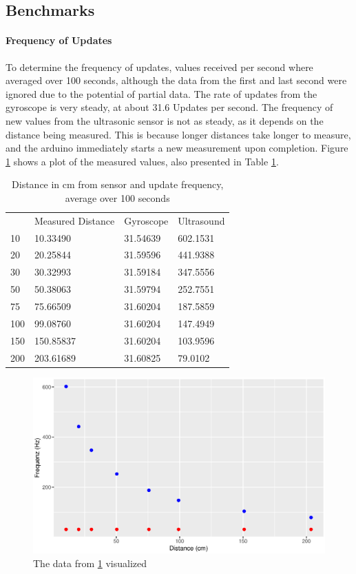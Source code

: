 \subsection{Benchmarks}
\label{subsec:benchmark}

\paragraph{Frequency of Updates}
To determine the frequency of updates, values received per second where averaged over 100 seconds, although the data from the first and last second were ignored due to the potential of partial data.
The rate of updates from the gyroscope is very steady, at about 31.6 Updates per second.
The frequency of new values from the ultrasonic sensor is not as steady, as it depends on the distance being measured.
This is because longer distances take longer to measure, and the arduino immediately starts a new measurement upon completion. Figure \ref{fig:benchmark} shows a plot of the measured values, also presented in Table \ref{table:benchmark}.

\begin{table}
    \centering
    \begin{tabular}{l|lll}
            & Measured Distance & Gyroscope & Ultrasound \\
        \cline{1-3}
        10  & 10.33490          & 31.54639  & 602.1531   \\
        20  & 20.25844          & 31.59596  & 441.9388   \\
        30  & 30.32993          & 31.59184  & 347.5556   \\
        50  & 50.38063          & 31.59794  & 252.7551   \\
        75  & 75.66509          & 31.60204  & 187.5859   \\
        100 & 99.08760          & 31.60204  & 147.4949   \\
        150 & 150.85837         & 31.60204  & 103.9596   \\
        200 & 203.61689         & 31.60825  & 79.0102    \\
    \end{tabular}

    \caption{Distance in cm from sensor and update frequency, average over 100 seconds}
    \label{table:benchmark}
\end{table}

\begin{figure}
    \centering
    \includegraphics[width=0.5\linewidth]{figures/benchmark.eps}
    \caption{The data from \ref{table:benchmark} visualized}
    \label{fig:benchmark}
\end{figure}

